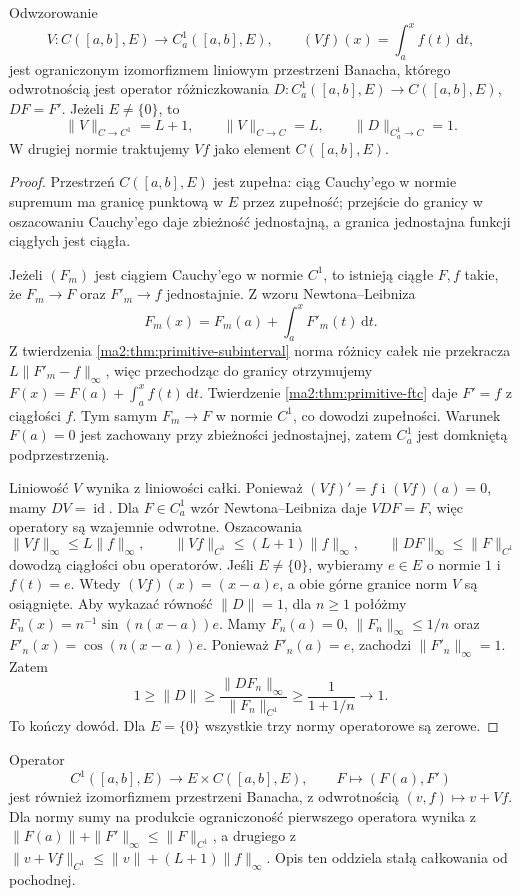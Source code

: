 \begin{twierdzenie}
\label{ma2:thm:primitive-operator}
Odwzorowanie
\[
 V:C([a,b],E)\to C^1_a([a,b],E),
 \qquad (Vf)(x)=\int_a^x f(t)\,\mathrm dt,
\]
jest ograniczonym izomorfizmem liniowym
przestrzeni Banacha, którego odwrotnością
jest operator różniczkowania
$D:C^1_a([a,b],E)\to C([a,b],E)$,
$DF=F'$. Jeżeli $E\ne\{0\}$, to
\[
 \|V\|_{C\to C^1}=L+1,\qquad
 \|V\|_{C\to C}=L,\qquad
 \|D\|_{C^1_a\to C}=1.
\]
W drugiej normie traktujemy $Vf$ jako
element $C([a,b],E)$.
\end{twierdzenie}
\begin{proof}
Przestrzeń $C([a,b],E)$ jest zupełna:
ciąg Cauchy'ego w normie supremum ma
granicę punktową w $E$ przez zupełność;
przejście do granicy w oszacowaniu
Cauchy'ego daje zbieżność jednostajną,
a granica jednostajna funkcji ciągłych
jest ciągła.

Jeżeli $(F_m)$ jest ciągiem Cauchy'ego
w normie $C^1$, to istnieją ciągłe $F,f$
takie, że $F_m\to F$ oraz $F'_m\to f$
jednostajnie. Z wzoru Newtona--Leibniza
\[
 F_m(x)=F_m(a)+\int_a^xF'_m(t)\,\mathrm dt.
\]
Z twierdzenia \ref{ma2:thm:primitive-subinterval}
norma różnicy całek nie przekracza
$L\|F'_m-f\|_\infty$, więc przechodząc do
granicy otrzymujemy
$F(x)=F(a)+\int_a^x f(t)\,\mathrm dt$.
Twierdzenie \ref{ma2:thm:primitive-ftc}
daje $F'=f$ z ciągłości $f$.
Tym samym $F_m\to F$ w normie $C^1$,
co dowodzi zupełności.
Warunek $F(a)=0$ jest zachowany przy
zbieżności jednostajnej, zatem $C^1_a$
jest domkniętą podprzestrzenią.

Liniowość $V$ wynika z liniowości całki.
Ponieważ $(Vf)'=f$ i $(Vf)(a)=0$,
mamy $DV=\operatorname{id}$.
Dla $F\in C^1_a$ wzór Newtona--Leibniza
daje $VDF=F$, więc operatory są wzajemnie
odwrotne.
Oszacowania
\[
 \|Vf\|_\infty\le L\|f\|_\infty,\qquad
 \|Vf\|_{C^1}\le(L+1)\|f\|_\infty,\qquad
 \|DF\|_\infty\le\|F\|_{C^1}
\]
dowodzą ciągłości obu operatorów.
Jeśli $E\ne\{0\}$, wybieramy $e\in E$
o normie $1$ i $f(t)=e$.
Wtedy $(Vf)(x)=(x-a)e$, a obie górne
granice norm $V$ są osiągnięte.
Aby wykazać równość $\|D\|=1$, dla
$n\ge1$ połóżmy $F_n(x)=n^{-1}\sin(n(x-a))e$.
Mamy $F_n(a)=0$, $\|F_n\|_\infty\le1/n$
oraz $F'_n(x)=\cos(n(x-a))e$.
Ponieważ $F'_n(a)=e$, zachodzi
$\|F'_n\|_\infty=1$. Zatem
\[
 1\ge\|D\|\ge
 \frac{\|DF_n\|_\infty}{\|F_n\|_{C^1}}
 \ge\frac{1}{1+1/n}\longrightarrow1.
\]
To kończy dowód. Dla $E=\{0\}$ wszystkie
trzy normy operatorowe są zerowe.
\end{proof}

Operator
\[
 C^1([a,b],E)\to E\times C([a,b],E),
 \qquad F\mapsto(F(a),F')
\]
jest również izomorfizmem przestrzeni
Banacha, z odwrotnością
$(v,f)\mapsto v+Vf$.
Dla normy sumy na produkcie ograniczoność
pierwszego operatora wynika z
$\|F(a)\|+\|F'\|_\infty\le\|F\|_{C^1}$,
a drugiego z
$\|v+Vf\|_{C^1}\le\|v\|+(L+1)\|f\|_\infty$.
Opis ten oddziela stałą całkowania od pochodnej.

